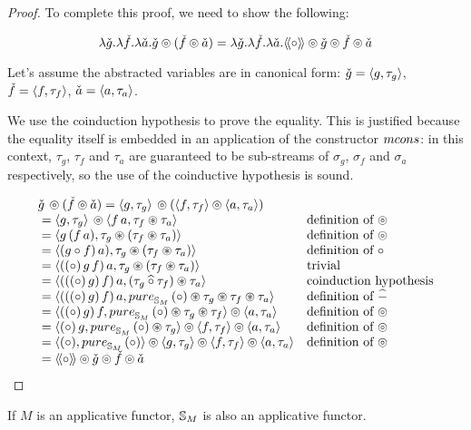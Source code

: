 \begin{proof}
To complete this proof, we need to show the following:

$$
\lambda \check{g}. \lambda \check{f}. \lambda \check{a}. \check{g} \circledcirc (\check{f}\circledcirc \check{a})
  = 
\lambda \check{g}. \lambda \check{f}. \lambda \check{a}. \mathopen{\langle\!\langle}{\circ}\mathclose{\rangle\!\rangle} \circledcirc \check{g}  \circledcirc \check{f}  \circledcirc \check{a}
$$

Let's assume the abstracted variables are in canonical form: $\check{g} = \langle g, \tau_g \rangle$, $\check{f} = \langle f, \tau_f \rangle$, $\check{a} = \langle a, \tau_a \rangle$.

We use the coinduction hypothesis to prove the equality.
This is justified because the equality itself is embedded in an application of the constructor $\mcons$: in this context, $\tau_g$, $\tau_f$ and $\tau_a$ are guaranteed to be sub-streams of $\sigma_g$, $\sigma_f$ and $\sigma_a$ respectively, so the use of the coinductive hypothesis is sound.

$$
\begin{array}{ll}
\pstr{g}\, \pappl (\pstr{f} \pappl \pstr{a})
 = \pair{g}{\tau_g}\, \pappl (\pair{f}{\tau_f} \pappl \pair{a}{\tau_a}) \\
{}= \pair{g}{\tau_g}\, \pappl \pair{f\, a}{\tau_f \appl \tau_a}
& \mbox{definition of }\pappl \\
{}= \pair{g\, (f\, a)}{\tau_g \appl (\tau_f \appl \tau_a)}
& \mbox{definition of }\pappl \\
{}= \pair{(g \comp f)\, a)}{\tau_g \appl (\tau_f \appl \tau_a)}
& \mbox{definition of }\comp \\
{}= \pair{((\comp)\, g\, f)\, a}{\tau_g \appl (\tau_f \appl \tau_a)}
& \mbox{trivial} \\
{}= \pair{(((\comp)\, g)\, f)\, a}{(\tau_g \alift{\comp} \tau_f) \appl \tau_a}
& \mbox{coinduction hypothesis} \\
{}= \pair{(((\comp)\, g)\, f)\, a}{\apure_{\stream{M}}\, (\comp) \appl \tau_g \appl \tau_f \appl \tau_a}
& \mbox{definition of }\alift{-} \\
{}= \pair{((\comp)\, g)\, f}{\apure_{\stream{M}}\, (\comp) \appl \tau_g \appl \tau_f} \pappl  \pair{a}{\tau_a}
& \mbox{definition of }\pappl \\
{}= \pair{(\comp)\, g}{\apure_{\stream{M}}\, (\comp) \appl \tau_g} \pappl \pair{f}{\tau_f} \pappl \pair{a}{\tau_a}
& \mbox{definition of }\pappl \\
{}= \pair{(\comp)}{\apure_{\stream{M}}\,(\comp)} \pappl \pair{g}{\tau_g} \pappl \pair{f}{\tau_f} \pappl \pair{a}{\tau_a}
& \mbox{definition of }\pappl \\
{}= \ppair{\comp} \pappl \pstr{g} \pappl \pstr{f} \pappl \pstr{a}
\end{array}
$$
\end{proof}


\begin{theorem}\label{lemma:appl_laws}
If $M$ is an applicative functor, $\mathbb{S}_{M}$ is also an applicative functor.
\end{theorem}
